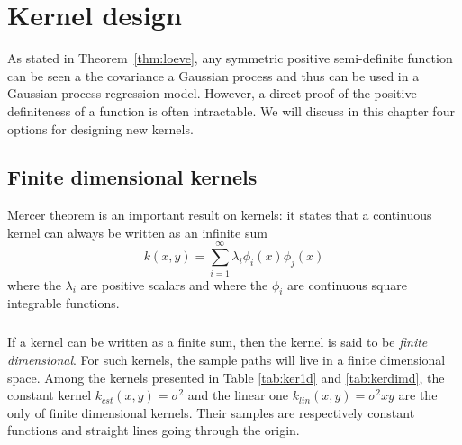 \documentclass[twoside,openright]{report}
\begin{document}
\chapter{Kernel design}

As stated in Theorem~\ref{thm:loeve}, any symmetric positive semi-definite function can be seen a the covariance a Gaussian process and thus can be used in a Gaussian process regression model. However, a direct proof of the positive definiteness of a function is often intractable. We will discuss in this chapter four options for designing new kernels.

\section{Finite dimensional kernels}
Mercer theorem is an important result on kernels: it states that a continuous kernel can always be written as an infinite sum 
\begin{equation}
	k(x,y) = \sum_{i=1}^\infty \lambda_i \phi_i(x) \phi_j(x)
\end{equation}
where the $\lambda_i$ are positive scalars and where the $\phi_i$ are continuous square integrable functions.

\paragraph{}
If a kernel can be written as a finite sum, then the kernel is said to be \emph{finite dimensional}. For such kernels, the sample paths will live in a finite dimensional space. Among the kernels presented in Table \ref{tab:ker1d} and \ref{tab:kerdimd}, the constant kernel $k_{cst}(x,y)=\sigma^2$ and the linear one $k_{lin}(x,y)=\sigma^2 xy$ are the only of finite dimensional kernels. Their samples are respectively constant functions and straight lines going through the origin. 
\end{document}
